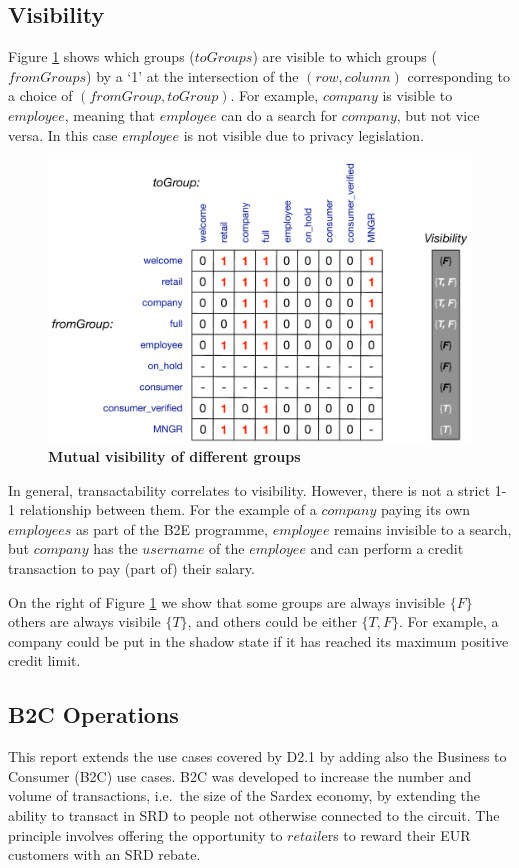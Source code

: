 \subsection{Visibility}
Figure \ref{fig:visibility} shows which groups ($toGroups$) are visible to which groups ($fromGroups$) by a `1' at the intersection of the $(row, column)$ corresponding to a choice of $(fromGroup, toGroup)$. For example, $company$ is visible to $employee$, meaning that $employee$ can do a search for $company$, but not vice versa. In this case $employee$ is not visible due to privacy legislation.

\begin{figure}[H]
\centering
\includegraphics[width=12cm]{Figures/Visibility}
\caption{\small\textbf{Mutual visibility of different groups}}
\label{fig:visibility}
\end{figure}

In general, transactability correlates to visibility. However, there is not a strict 1-1 relationship between them. For the example of a $company$ paying its own $employees$ as part of the B2E programme, $employee$ remains invisible to a search, but $company$ has the $username$ of the $employee$ and can perform a credit transaction to pay (part of) their salary.

On the right of Figure \ref{fig:visibility} we show that some groups are always invisible $\{ F \}$ others are always visibile $\{ T \}$, and others could be either $\{T, F\}$. For example, a company could be put in the shadow state if it has reached its maximum positive credit limit.

\subsection{B2C Operations}
This report extends the use cases covered by D2.1 by adding also the Business to Consumer (B2C) use cases. B2C was developed to increase the number and volume of transactions, i.e.\ the size of the Sardex economy, by extending the ability to transact in SRD to people not otherwise connected to the circuit. The principle involves offering the opportunity to $retail$ers to reward their EUR customers with an SRD rebate.

